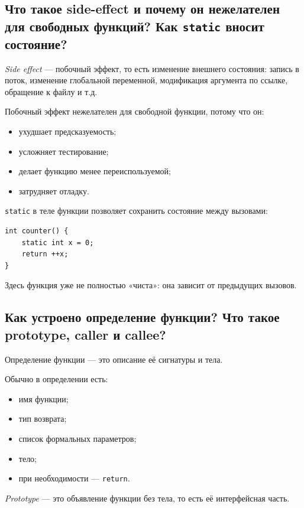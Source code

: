 \subsection{Что такое side-effect и почему он нежелателен для свободных функций? Как \texttt{static} вносит состояние?}
\begin{definition}
\textit{Side effect} — побочный эффект, то есть изменение внешнего состояния: запись в поток, изменение глобальной переменной, модификация аргумента по ссылке, обращение к файлу и т.д.
\end{definition}

Побочный эффект нежелателен для свободной функции, потому что он:
\begin{itemize}
    \item ухудшает предсказуемость;
    \item усложняет тестирование;
    \item делает функцию менее переиспользуемой;
    \item затрудняет отладку.
\end{itemize}

\texttt{static} в теле функции позволяет сохранить состояние между вызовами:
\begin{verbatim}
int counter() {
    static int x = 0;
    return ++x;
}
\end{verbatim}

Здесь функция уже не полностью «чиста»: она зависит от предыдущих вызовов.

\subsection{Как устроено определение функции? Что такое prototype, caller и callee?}
\begin{definition}
Определение функции — это описание её сигнатуры и тела.
\end{definition}

Обычно в определении есть:
\begin{itemize}
    \item имя функции;
    \item тип возврата;
    \item список формальных параметров;
    \item тело;
    \item при необходимости — \texttt{return}.
\end{itemize}

\begin{definition}[Prototype]
\textit{Prototype} — это объявление функции без тела, то есть её интерфейсная часть.
\end{definition}

